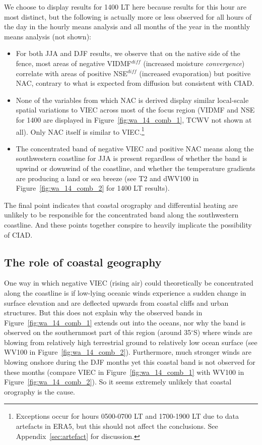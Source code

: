 We choose to display results for 1400 \ac{LT} here because results for this hour are most distinct, but the following is actually more or less observed for all hours of the day in the hourly means analysis and all months of the year in the monthly means analysis (not shown):
\begin{itemize}
	\item For both \ac{JJA} and \ac{DJF} results, we observe that on the native side of the fence, most areas of negative \ac{VIDMF}$^{diff}$ (increased moisture \textit{convergence}) correlate with areas of positive \ac{NSE}$^{diff}$ (increased evaporation) but positive \ac{NAC}, contrary to what is expected from diffusion but consistent with \ac{CIAD}.
	\item None of the variables from which \ac{NAC} is derived display similar local-scale spatial variations to \ac{VIEC} across most of the focus region (\ac{VIDMF} and \ac{NSE} for 1400 are displayed in Figure~\ref{fig:wa_14_comb_1}, \ac{TCWV} not shown at all). Only \ac{NAC} itself is similar to \ac{VIEC}.\footnote{Exceptions occur for hours 0500-0700 \ac{LT} and 1700-1900 \ac{LT} due to data artefacts in \ac{ERA5}, but this should not affect the conclusions. See Appendix~\ref{sec:artefact} for discussion.}
	\item The concentrated band of negative \ac{VIEC} and positive \ac{NAC} means along the southwestern coastline for \ac{JJA} is present regardless of whether the band is upwind or downwind of the coastline, and whether the temperature gradients are producing a land or sea breeze (see \ac{T2} and \ac{dWV100} in Figure~\ref{fig:wa_14_comb_2} for 1400 \ac{LT} results).
\end{itemize}

The final point indicates that coastal orography and differential heating are unlikely to be responsible for the concentrated band along the southwestern coastline. And these points together conspire to heavily implicate the possibility of \ac{CIAD}.

\subsection{The role of coastal geography}

One way in which negative \ac{VIEC} (rising air) could theoretically be concentrated along the coastline is if low-lying oceanic winds experience a sudden change in surface elevation and are deflected upwards from coastal cliffs and urban structures. But this does not explain why the observed bands in Figure~\ref{fig:wa_14_comb_1} extends out into the oceans, nor why the band is observed on the southernmost part of this region (around 35$^\circ$S) where winds are blowing from relatively high terrestrial ground to relatively low ocean surface (see \ac{WV100} in Figure~\ref{fig:wa_14_comb_2}). Furthermore, much stronger winds are blowing onshore during the \ac{DJF} months yet this coastal band is not observed for these months (compare \ac{VIEC} in Figure~\ref{fig:wa_14_comb_1} with \ac{WV100} in Figure~\ref{fig:wa_14_comb_2}). So it seems extremely unlikely that coastal orography is the cause.

